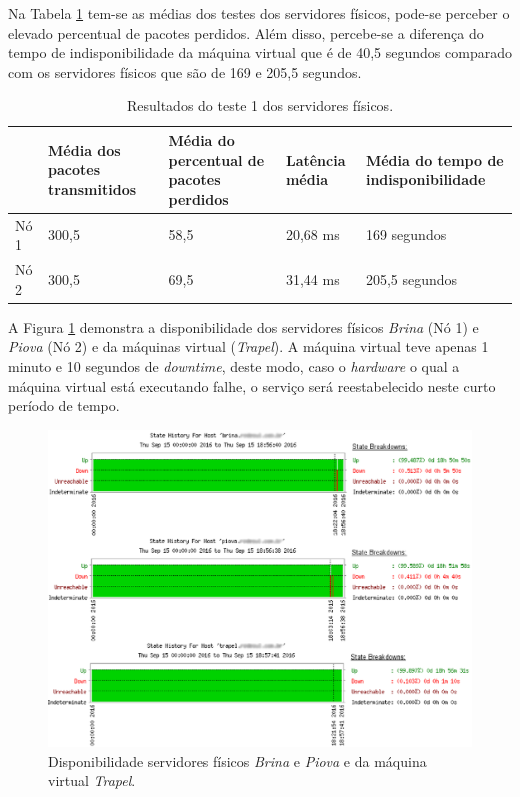 Na Tabela \ref{tab:teste1resultados} tem-se as médias dos testes dos servidores físicos, pode-se perceber o elevado percentual de pacotes perdidos. 
Além disso, percebe-se a diferença do tempo de indisponibilidade da máquina virtual que é de 40,5 segundos comparado com os servidores 
físicos que são de 169 e 205,5 segundos.

\begin{table}[h!]
\caption{Resultados do teste 1 dos servidores físicos.}
\label{tab:teste1resultados}
\begin{center}
\begin{tabular}{|l|p{2.2cm}|p{2.5cm}|p{2cm}|p{2.7cm}|}\hline
 & \textbf{Média dos pacotes transmitidos} & \textbf{Média do percentual de pacotes perdidos} & \textbf{Latência média} & \textbf{Média do tempo de indisponibilidade} \\\hline
Nó 1 & 300,5 & 58,5 & 20,68 ms & 169 segundos \\\hline
Nó 2 & 300,5 & 69,5 & 31,44 ms & 205,5 segundos \\\hline
\end{tabular}
\end{center}
\end{table}

A Figura \ref{fig:teste1_disponibilidade} demonstra a disponibilidade dos servidores físicos \textit{Brina} (Nó 1) e \textit{Piova} (Nó 2) e da 
máquinas virtual (\textit{Trapel}). A máquina virtual teve apenas 1 minuto e 10 segundos de \textit{downtime}, deste modo, caso o 
\textit{hardware} o qual a máquina virtual está executando falhe, o serviço será reestabelecido neste curto período de tempo.

\begin{figure}[h!]
 \centering
 \includegraphics[width=470px]{img/teste1_disponibilidade.eps}
 \caption{Disponibilidade servidores físicos \textit{Brina} e \textit{Piova} e da máquina virtual \textit{Trapel}.}
 \label{fig:teste1_disponibilidade}
\end{figure}


